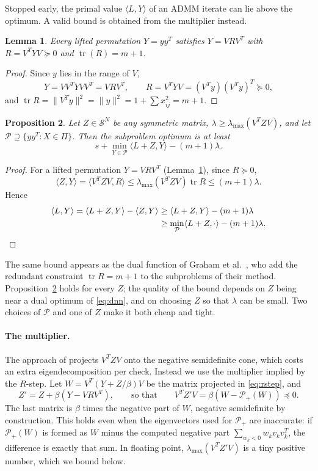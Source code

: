 \documentclass[11pt]{article}
\newtheorem{proposition}{Proposition}
\newtheorem{lemma}[proposition]{Lemma}
\theoremstyle{remark}
\newcommand{\Sym}{\mathcal{S}}
\newcommand{\tr}{\operatorname{tr}}
\newcommand{\inner}[2]{\langle #1, #2\rangle}
\newcommand{\lmax}{\lambda_{\max}}
\newcommand{\Pspd}{\mathcal{P}_{+}}
\begin{document}
Stopped early, the primal value $\inner{L}{Y}$ of an ADMM iterate can lie above
the optimum. A valid bound is obtained from the multiplier instead.

\begin{lemma}\label{lem:trace}
Every lifted permutation $Y = yy^T$ satisfies $Y = VRV^T$ with
$R = V^TYV\succeq0$ and $\tr(R) = m+1$.
\end{lemma}
\begin{proof}
Since $y$ lies in the range of $V$,
\[
  Y = VV^TYVV^T = VRV^T, \qquad R = V^TYV = (V^Ty)(V^Ty)^T\succeq0,
\]
and $\tr R = \|V^Ty\|^2 = \|y\|^2 = 1 + \sum x_{ij}^2 = m+1$.
\end{proof}

\begin{proposition}\label{prop:cert}
Let $Z\in\Sym^N$ be any symmetric matrix, $\lambda \ge \lmax(V^TZV)$, and let
$\mathcal{P}\supseteq\{yy^T : X\in\Pi\}$. Then the subproblem optimum is at least
\begin{equation}\label{eq:cert}
  s + \min_{Y\in\mathcal{P}} \inner{L+Z}{Y} - (m+1)\lambda .
\end{equation}
\end{proposition}
\begin{proof}
For a lifted permutation $Y = VRV^T$ (Lemma~\ref{lem:trace}), since $R\succeq0$,
\[
  \inner{Z}{Y} = \inner{V^TZV}{R} \le \lmax(V^TZV)\tr R \le (m+1)\lambda .
\]
Hence
\begin{align*}
  \inner{L}{Y} = \inner{L+Z}{Y} - \inner{Z}{Y} &\ge \inner{L+Z}{Y} - (m+1)\lambda\\
  &\ge \min_{\mathcal{P}}\inner{L+Z}{\cdot} - (m+1)\lambda. \qedhere
\end{align*}
\end{proof}

The same bound appears as the dual function of Graham et al.\ \cite[eq.~(3.11),
Thm.~3.4]{graham}, who add the redundant constraint $\tr R = m+1$ to the
subproblems of their method. Proposition~\ref{prop:cert} holds for every $Z$; the quality of
the bound depends on $Z$ being near a dual optimum of \eqref{eq:dnn}, and on
choosing $Z$ so that $\lambda$ can be small. Two choices of $\mathcal{P}$ and one of
$Z$ make it both cheap and tight.

\paragraph{The multiplier.} The approach of \cite{owx} projects $V^TZV$ onto the
negative semidefinite cone, which costs an extra eigendecomposition per check.
Instead we use the multiplier implied by the $R$-step. Let $W = V^T(Y+Z/\beta)V$ be
the matrix projected in \eqref{eq:rstep}, and
\[
  Z' = Z + \beta(Y - VRV^T), \qquad\text{so that}\qquad V^TZ'V = \beta(W - \Pspd(W)) \preceq 0 .
\]
The last matrix is $\beta$ times the negative part of $W$, negative semidefinite by
construction. This holds even when the eigenvectors used for $\Pspd$ are
inaccurate: if $\Pspd(W)$ is formed as $W$ minus the computed negative part
$\sum_{w_k<0} w_k v_kv_k^T$, the difference is exactly that sum. In floating
point, $\lmax(V^TZ'V)$ is a tiny positive number, which we bound below.
\end{document}
